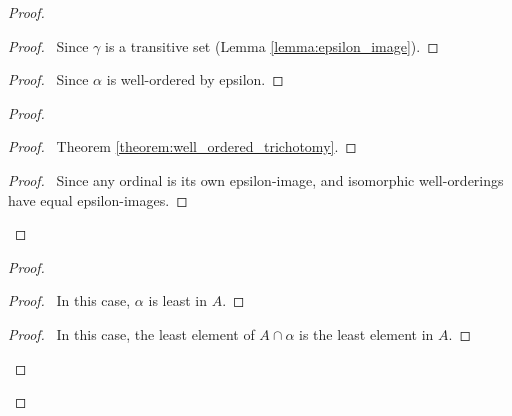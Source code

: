 \documentclass{article}
\let\qed\relax
\theoremstyle{definition}
\begin{document}
    \begin{proof}
        \pf
        \begin{proof}
            \pf\ Since $\gamma$ is a transitive set (Lemma \ref{lemma:epsilon_image}).
        \end{proof}
        \begin{proof}
            \pf\ Since $\alpha$ is well-ordered by epsilon.
        \end{proof}
        \begin{proof}
            \begin{proof}
                \pf\ Theorem \ref{theorem:well_ordered_trichotomy}.
            \end{proof}
            \begin{proof}
                \pf\ Since any ordinal is its own epsilon-image, and isomorphic well-orderings have equal
                epsilon-images.
            \end{proof}
        \end{proof}
        \begin{proof}
            \begin{proof}
                \pf\ In this case, $\alpha$ is least in $A$.
            \end{proof}
            \begin{proof}
                \pf\ In this case, the least element of $A \cap \alpha$ is the least element in $A$.
            \end{proof}
        \end{proof}
        \qed
    \end{proof}
\end{document}
